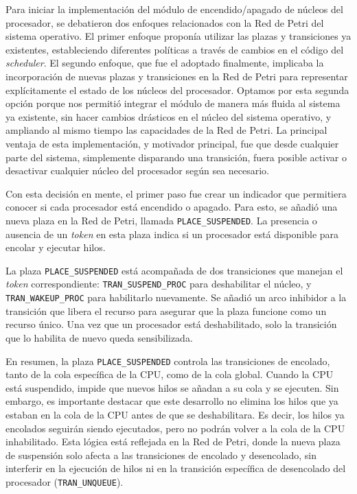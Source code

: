 Para iniciar la implementación del módulo de encendido/apagado de núcleos del procesador, se debatieron dos enfoques relacionados con la Red de Petri del sistema operativo. El primer enfoque proponía utilizar las plazas y transiciones ya existentes, estableciendo diferentes políticas a través de cambios en el código del \textit{scheduler}. El segundo enfoque, que fue el adoptado finalmente, implicaba la incorporación de nuevas plazas y transiciones en la Red de Petri para representar explícitamente el estado de los núcleos del procesador. Optamos por esta segunda opción porque nos permitió integrar el módulo de manera más fluida al sistema ya existente, sin hacer cambios drásticos en el núcleo del sistema operativo, y ampliando al mismo tiempo las capacidades de la Red de Petri. La principal ventaja de esta implementación, y motivador principal, fue que desde cualquier parte del sistema, simplemente disparando una transición, fuera posible activar o desactivar cualquier núcleo del procesador según sea necesario.

Con esta decisión en mente, el primer paso fue crear un indicador que permitiera conocer si cada procesador está encendido o apagado. Para esto, se añadió una nueva plaza en la Red de Petri, llamada \texttt{PLACE\_SUSPENDED}. La presencia o ausencia de un \textit{token} en esta plaza indica si un procesador está disponible para encolar y ejecutar hilos.

La plaza \texttt{PLACE\_SUSPENDED} está acompañada de dos transiciones que manejan el \textit{token} correspondiente: \texttt{TRAN\_SUSPEND\_PROC} para deshabilitar el núcleo, y \texttt{TRAN\_WAKEUP\_PROC} para habilitarlo nuevamente. Se añadió un arco inhibidor a la transición que libera el recurso para asegurar que la plaza funcione como un recurso único. Una vez que un procesador está deshabilitado, solo la transición que lo habilita de nuevo queda sensibilizada.

En resumen, la plaza \texttt{PLACE\_SUSPENDED} controla las transiciones de encolado, tanto de la cola específica de la CPU, como de la cola global. Cuando la CPU está suspendido, impide que nuevos hilos se añadan a su cola y se ejecuten. Sin embargo, es importante destacar que este desarrollo no elimina los hilos que ya estaban en la cola de la CPU antes de que se deshabilitara. Es decir, los hilos ya encolados seguirán siendo ejecutados, pero no podrán volver a la cola de la CPU inhabilitado. Esta lógica está reflejada en la Red de Petri, donde la nueva plaza de suspensión solo afecta a las transiciones de encolado y desencolado, sin interferir en la ejecución de hilos ni en la transición específica de desencolado del procesador (\texttt{TRAN\_UNQUEUE}).

